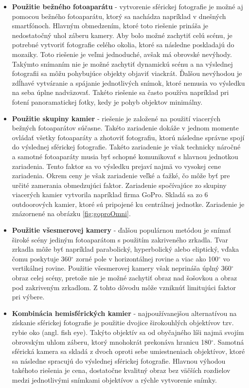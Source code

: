 \documentclass[slovak,master,dept460,male,cpp,cpdeclaration]{diploma}
\begin{document}
\begin{itemize}
\item \textbf{Použitie bežného fotoaparátu} - vytvorenie sférickej fotografie je možné aj pomocou  bežného fotoaparátu, ktorý sa nachádza napríklad v dnešných smartfónoch. Hlavným obmedzením, ktoré toto riešenie prináša je nedostatočný uhol záberu kamery. Aby bolo možné zachytiť celú scénu, je potrebné  vytvoriť fotografie celého okolia, ktoré sa následne poskladajú  do mozaiky. Toto riešenie je veľmi jednoduché, avšak má obrovské nevýhody. Takýmto  snímaním nie je možné zachytiť dynamickú scénu a na výslednej fotografii sa môžu pohybujúce objekty objaviť viackrát. Ďalšou nevýhodou je zdĺhavé vytváranie a spájanie jednotlivých snímok, ktoré nemusia vo výsledku  na seba úplne nadväzovať. Takéto riešenie sa často používa napríklad pri  fotení panoramatickej fotky, kedy je pohyb objektov minimálny.

\item \textbf{Použitie skupiny kamier} - riešenie je založené na použití viacerých bežných fotoaparátov súčasne. Takéto zariadenie dokáže v jednom momente ovládať všetky fotoaparáty a zhotoviť fotografiu, ktorú následne správne spojí do výslednej sférickej fotografie. Takéto zariadenie je však technicky náročné a samotné fotoaparáty musia byť schopné komunikovať s hlavnou jednotkou zariadenia. Tento faktor sa vo výsledku prejaví najmä vo vysokej cene zariadenia. Okrem ceny  je však zariadenie veľké a ťažké, čo môže byť pre určité zamerania obmedzujúci faktor. Zariadenie spočívajúce zo skupiny viacerých kamier vytvorila napríklad firma GoPro. Skladá sa zo 6 outdoorových kamier, ktoré sú pripojené ku centrálnej jednotke. Zariadenie je znázornené na obrázku \ref{fig:goproOmni}.

\item \textbf{Použitie všesmerovej kamery} - ďalšou populárnou metódou je snímať široké scény jediným fotoaparátom s použitím zakriveného zrkadla. Tvar zrkadla môže byť napríklad parabolický, hyperbolický alebo eliptický, vďaka čomu  poskytuje 360$ ^\circ$ zorné pole v horizontálnej rovine a viac ako 100$^\circ$ vo vertikálnej rovine. Použitie všesmerovej kamery však neprináša  úplný 360$ ^\circ$  obraz celej scény, pretože nie je možné zachytiť  obraz nad šošovkou a obraz pod zakriveným zrkadlom. Z tohto dôvodu môže vzniknúť limitujúci faktor pri výbere.  

\item \textbf{Kombinácia hemisférických kamier} - najpoužívanejšou alternatívou na získanie sférickej fotografie je použitie dvojice širokouhlých objektívov tzv. rybie oko (angl. fish eye). Takýto objektív sa od obyčajného líši najmä svojím obrovským uhlom záberu, ktorý  mnohokrát prekonáva hranicu 180$ ^\circ$. Samotná sférická kamera sa skladá z dvoch oproti sebe umiestneniach objektívov, ktoré sa následne spracujú do výslednej sférickej fotografie. Hlavnou výhodou takéhoto riešenia je cena, dostatočne kvalitný obraz bez väčších rozdielov medzi jednotlivými snímkami objektívov a rýchle vytvorenie snímky.

\end{itemize}
\end{document}
